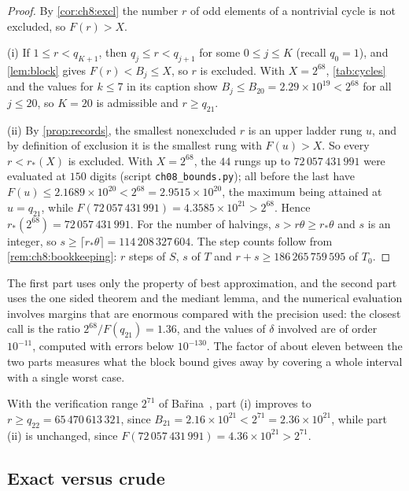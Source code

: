 \begin{proof}
By \cref{cor:ch8:excl} the number $r$ of odd elements of a nontrivial cycle is
not excluded, so $F(r)>X$.

(i) If $1\leq r<q_{K+1}$, then $q_j\leq r<q_{j+1}$ for some $0\leq j\leq K$
(recall $q_0=1$), and \cref{lem:block} gives $F(r)<B_j\leq X$, so $r$ is
excluded. With $X=2^{68}$, \cref{tab:cycles} and the values for $k\leq7$ in
its caption show $B_j\leq B_{20}=2.29\times10^{19}<2^{68}$ for all $j\leq20$,
so $K=20$ is admissible and $r\geq q_{21}$.

(ii) By \cref{prop:records}, the smallest nonexcluded $r$ is an upper ladder
rung $u$, and by definition of exclusion it is the smallest rung with
$F(u)>X$. So every $r<r_*(X)$ is excluded. With $X=2^{68}$, the $44$ rungs up
to $72\,057\,431\,991$ were evaluated at $150$ digits (script
\texttt{ch08\_bounds.py}); all before the last have $F(u)\leq
2.1689\times10^{20}<2^{68}=2.9515\times10^{20}$, the maximum being attained at
$u=q_{21}$, while $F(72\,057\,431\,991)=4.3585\times10^{21}>2^{68}$. Hence
$r_*(2^{68})=72\,057\,431\,991$. For the number of halvings, $s>r\theta\geq
r_*\theta$ and $s$ is an integer, so $s\geq\lceil r_*\theta\rceil=
114\,208\,327\,604$. The step counts follow from
\cref{rem:ch8:bookkeeping}: $r$ steps of $S$, $s$ of $T$ and $r+s\geq
186\,265\,759\,595$ of $T_0$.
\end{proof}

The first part uses only the property of best
approximation, and the second part uses the one sided theorem and the mediant lemma, and the numerical
evaluation involves margins that are enormous compared with the precision
used: the closest call is the ratio $2^{68}/F(q_{21})=1.36$, and the values of
$\delta$ involved are of order $10^{-11}$, computed with errors below
$10^{-130}$. The factor of about eleven between the two parts measures what
the block bound gives away by covering a whole interval with a single worst
case.

With the verification range $2^{71}$ of Ba\v{r}ina~\cite{barina2025}, part (i) improves to $r\geq q_{22}=65\,470\,613\,321$, since $B_{21}=2.16\times10^{21}<2^{71}=2.36\times10^{21}$, while part (ii) is unchanged, since $F(72\,057\,431\,991)=4.36\times10^{21}>2^{71}$.

\subsection{Exact versus crude}

